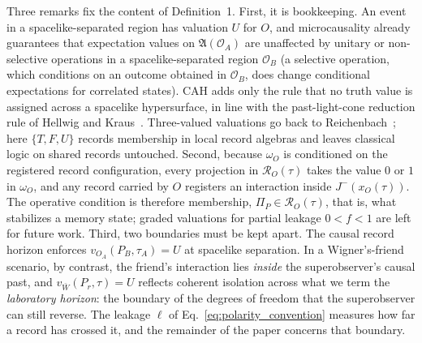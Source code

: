 Three remarks fix the content of Definition~1. First, it is bookkeeping. An event in a spacelike-separated region has valuation $U$ for $O$, and microcausality already guarantees that expectation values on $\mathfrak{A}(\mathcal{O}_A)$ are unaffected by unitary or non-selective operations in a spacelike-separated region $\mathcal{O}_B$ (a selective operation, which conditions on an outcome obtained in $\mathcal{O}_B$, does change conditional expectations for correlated states). CAH adds only the rule that no truth value is assigned across a spacelike hypersurface, in line with the past-light-cone reduction rule of Hellwig and Kraus~\cite{hellwig1970}. Three-valued valuations go back to Reichenbach~\cite{reichenbach1944}; here $\{T, F, U\}$ records membership in local record algebras and leaves classical logic on shared records untouched. Second, because $\omega_O$ is conditioned on the registered record configuration, every projection in $\mathcal{R}_O(\tau)$ takes the value $0$ or $1$ in $\omega_O$, and any record carried by $O$ registers an interaction inside $J^-(x_O(\tau))$. The operative condition is therefore membership, $\Pi_P \in \mathcal{R}_O(\tau)$, that is, what stabilizes a memory state; graded valuations for partial leakage $0 < f < 1$ are left for future work. Third, two boundaries must be kept apart. The causal record horizon enforces $v_{O_A}(P_B, \tau_A) = U$ at spacelike separation. In a Wigner's-friend scenario, by contrast, the friend's interaction lies \emph{inside} the superobserver's causal past, and $v_{\bar{W}}(P_r, \tau) = U$ reflects coherent isolation across what we term the \emph{laboratory horizon}: the boundary of the degrees of freedom that the superobserver can still reverse. The leakage $\ell$ of Eq.~\eqref{eq:polarity_convention} measures how far a record has crossed it, and the remainder of the paper concerns that boundary.

